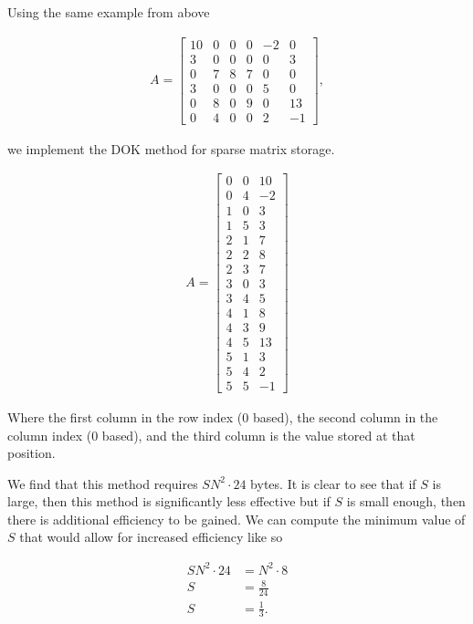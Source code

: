 \documentclass[../fem.tex]{subfiles}
\begin{document}
Using the same example from above

\begin{align*}
  A = \begin{bmatrix}
    10 & 0 & 0 & 0 & -2 & 0 \\
    3 & 0 & 0 & 0 & 0 & 3 \\
    0 & 7 & 8 & 7 & 0 & 0 \\
    3 & 0 & 0 & 0 & 5 & 0 \\
    0 & 8 & 0 & 9 & 0 & 13 \\
    0 & 4 & 0 & 0 & 2 & -1
  \end{bmatrix},
\end{align*}

we implement the DOK method for sparse matrix storage.

\begin{align*}
  A = \begin{bmatrix}
    0 & 0 & 10 \\
    0 & 4 & -2 \\
    1 & 0 & 3 \\
    1 & 5 & 3 \\
    2 & 1 & 7 \\
    2 & 2 & 8 \\
    2 & 3 & 7 \\
    3 & 0 & 3 \\
    3 & 4 & 5 \\
    4 & 1 & 8 \\
    4 & 3 & 9 \\
    4 & 5 & 13 \\
    5 & 1 & 3 \\
    5 & 4 & 2 \\
    5 & 5 & -1
  \end{bmatrix}
\end{align*}

Where the first column in the row index ($0$ based), the second column in the
column index ($0$ based), and the third column is the value stored at that
position.

We find that this method requires $SN^2\cdot24$ bytes. It is clear to see that
if $S$ is large, then this method is significantly less effective but if $S$ is
small enough, then there is additional efficiency to be gained. We can compute
the minimum value of $S$ that would allow for increased efficiency like so

\begin{align*}
  SN^2\cdot24&=N^2\cdot8\\
  S&=\frac{8}{24}\\
  S&=\frac{1}{3}.
\end{align*}
\end{document}
